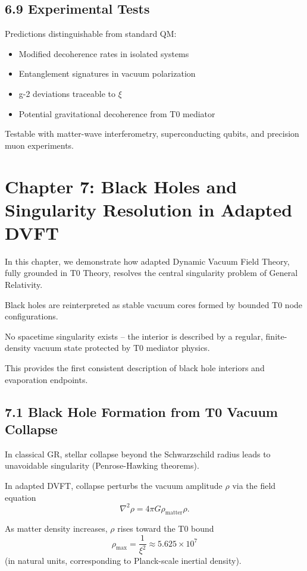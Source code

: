 	\subsection{6.9 Experimental Tests}
	
	Predictions distinguishable from standard QM:
	\begin{itemize}
		\item Modified decoherence rates in isolated systems
		\item Entanglement signatures in vacuum polarization
		\item g-2 deviations traceable to $\xi$
		\item Potential gravitational decoherence from T0 mediator
	\end{itemize}
	
	Testable with matter-wave interferometry, superconducting qubits, and precision muon experiments.
	
	\section{Chapter 7: Black Holes and Singularity Resolution in Adapted DVFT}
	
	In this chapter, we demonstrate how adapted Dynamic Vacuum Field Theory, fully grounded in T0 Theory, resolves the central singularity problem of General Relativity.
	
	Black holes are reinterpreted as stable vacuum cores formed by bounded T0 node configurations.
	
	No spacetime singularity exists – the interior is described by a regular, finite-density vacuum state protected by T0 mediator physics.
	
	This provides the first consistent description of black hole interiors and evaporation endpoints.
	
	\subsection{7.1 Black Hole Formation from T0 Vacuum Collapse}
	
	In classical GR, stellar collapse beyond the Schwarzschild radius leads to unavoidable singularity (Penrose-Hawking theorems).
	
	In adapted DVFT, collapse perturbs the vacuum amplitude $\rho$ via the field equation
	\[
	\nabla^2 \rho = 4\pi G \rho_{\text{matter}} \rho.
	\]
	
	As matter density increases, $\rho$ rises toward the T0 bound
	\[
	\rho_{\text{max}} = \frac{1}{\xi^2} \approx 5.625 \times 10^7
	\]
	(in natural units, corresponding to Planck-scale inertial density).
	
